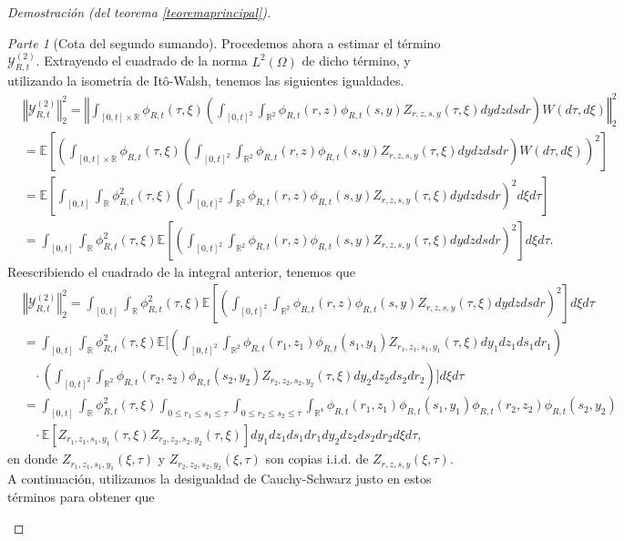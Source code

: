 \documentclass[letterpaper,twoside,12pt]{book}
\newcommand{\R}{\mathbb{R}}
\newcommand{\E}{\mathbb{E}}
\newcommand{\1}{\mathds{1}}
\newcommand{\norm}[1]{\left\Vert #1 \right\Vert}
\theoremstyle{definition}
\theoremstyle{definition}
\theoremstyle{remark}
\newtheorem{proofpart}{Parte}
\theoremstyle{definition}
\theoremstyle{definition}
\theoremstyle{definition}
\theoremstyle{definition}
\theoremstyle{definition}
\begin{document}
\begin{proof}[Demostración (del teorema \ref{teoremaprincipal})]
\begin{proofpart}[Cota del segundo sumando]
Procedemos ahora a estimar el término $\mathcal{Y}_{R,t}^{(2)}$. Extrayendo el cuadrado de la norma $L^{2}(\Omega)$ de dicho término, y utilizando la isometría de Itô-Walsh, tenemos las siguientes igualdades.
\begin{align*}
   &\norm{\mathcal{Y}_{R,t}^{(2)}}_2^{2}=\norm{\int_{[0,t]\times\R}\phi_{R,t}(\tau,\xi)\left(\int_{[0,t]^2}\int_{\R^2}\phi_{R,t}(r,z)\phi_{R,t}(s,y)Z_{r,z,s,y}(\tau,\xi)dy dz ds dr\right)W(d\tau,d\xi)}_2^2\\
   &=\E\left[\left(\int_{[0,t]\times\R}\phi_{R,t}(\tau,\xi)\left(\int_{[0,t]^2}\int_{\R^2}\phi_{R,t}(r,z)\phi_{R,t}(s,y)Z_{r,z,s,y}(\tau,\xi)dy dz ds dr\right)W(d\tau,d\xi)\right)^2\right]\\
   &=\E\left[\int_{[0,t]}\int_\R\phi_{R,t}^2(\tau,\xi)\left(\int_{[0,t]^2}\int_{\R^2}\phi_{R,t}(r,z)\phi_{R,t}(s,y)Z_{r,z,s,y}(\tau,\xi)dy dz ds dr\right)^2d\xi d\tau\right]\\
   &=\int_{[0,t]}\int_\R\phi_{R,t}^2(\tau,\xi)\E\left[\left(\int_{[0,t]^2}\int_{\R^2}\phi_{R,t}(r,z)\phi_{R,t}(s,y)Z_{r,z,s,y}(\tau,\xi)dy dz ds dr\right)^2\right]d\xi d\tau.
\end{align*}
Reescribiendo el cuadrado de la integral anterior, tenemos que 
\begin{align*}
   &\norm{\mathcal{Y}_{R,t}^{(2)}}_2^{2}=\int_{[0,t]}\int_\R\phi_{R,t}^2(\tau,\xi)\E\left[\left(\int_{[0,t]^2}\int_{\R^2}\phi_{R,t}(r,z)\phi_{R,t}(s,y)Z_{r,z,s,y}(\tau,\xi)dy dz ds dr\right)^2\right]d\xi d\tau\\
   &=\int_{[0,t]}\int_\R\phi_{R,t}^2(\tau,\xi)\E\Bigg[\left(\int_{[0,t]^2}\int_{\R^2}\phi_{R,t}(r_1,z_1)\phi_{R,t}(s_1,y_1)Z_{r_1,z_1,s_1,y_1}(\tau,\xi)dy_1dz_1ds_1dr_1\right)\\
   &\ \ \ \ \cdot \left(\int_{[0,t]^2}\int_{\R^2}\phi_{R,t}(r_2,z_2)\phi_{R,t}(s_2,y_2)Z_{r_2,z_2,s_2,y_2}(\tau,\xi)dy_2dz_2ds_2dr_2\right)\Bigg]d\xi d\tau\\
   &=\int_{[0,t]}\int_\R\phi_{R,t}^2(\tau,\xi)\int_{0\leq r_1\leq s_1\leq \tau}\int_{0\leq r_2\leq s_2\leq \tau}\int_{\R^4}\phi_{R,t}(r_1,z_1)\phi_{R,t}(s_1,y_1)\phi_{R,t}(r_2,z_2)\phi_{R,t}(s_2,y_2)\\
   &\ \ \ \ \cdot \E\left[Z_{r_1,z_1,s_1,y_1}(\tau,\xi)Z_{r_2,z_2,s_2,y_2}(\tau,\xi)\right]dy_1dz_1ds_1dr_1dy_2dz_2ds_2dr_2d\xi d\tau,
\end{align*}
en donde $Z_{r_1,z_1,s_1,y_1}(\xi,\tau)$ y $Z_{r_2,z_2,s_2,y_2}(\xi,\tau)$ son copias i.i.d. de $Z_{r,z,s,y}(\xi,\tau)$. A continuación, utilizamos la desigualdad de Cauchy-Schwarz justo en estos términos para obtener que 

\end{proofpart}
\end{proof}
\end{document}
